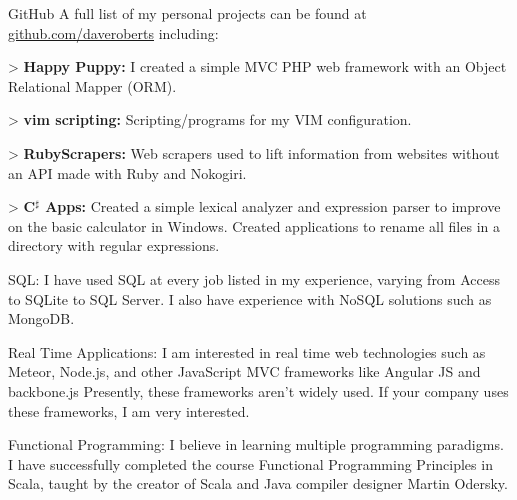 \documentclass[10pt,letterpaper]{article}
\newenvironment{indentsection}[1]%
{\begin{list}{}%
	{\setlength{\leftmargin}{#1}}%
	\item[]%
}
{\end{list}}
\begin{document}
\begin{indentsection}{\parindent}
\begin{description*}
	\item[GitHub]
	A full list of my personal projects can be found at \href{http://github.com/daveroberts}{github.com/daveroberts} including:
	\begin{itemize*}
    \item[>] \textbf{Happy Puppy: }I created a simple {\color{blue} MVC PHP} web framework with an Object Relational Mapper (ORM).
    \item[>] \textbf{vim scripting: }Scripting/programs for my {\color{blue} VIM} configuration.
    \item[>] \textbf{RubyScrapers: }Web scrapers used to lift information from websites without an API made with Ruby and Nokogiri.
    \item[>] \textbf{C$^\sharp$ Apps: }Created a simple lexical analyzer and expression parser to improve on the basic calculator in Windows.  Created applications to rename all files in a directory with regular expressions.
	\end{itemize*}
	\item[SQL:]I have used SQL at every job listed in my experience, varying from Access to SQLite to SQL Server.  I also have experience with {\color{blue} NoSQL} solutions such as {\color{blue} MongoDB}.
	\item[Real Time Applications:]I am interested in real time web technologies such as {\color{blue} Meteor}, {\color{blue} Node.js}, and other JavaScript MVC frameworks like {\color{blue} Angular JS} and {\color{blue} backbone.js}  Presently, these frameworks aren't widely used.  If your company uses these frameworks, I am very interested.
	\item[Functional Programming:]I believe in learning multiple programming paradigms.  I have successfully completed the course {\color{blue} Functional Programming Principles in Scala}, taught by the creator of Scala and Java compiler designer Martin Odersky.

\end{description*}
\end{indentsection}
\end{document}

